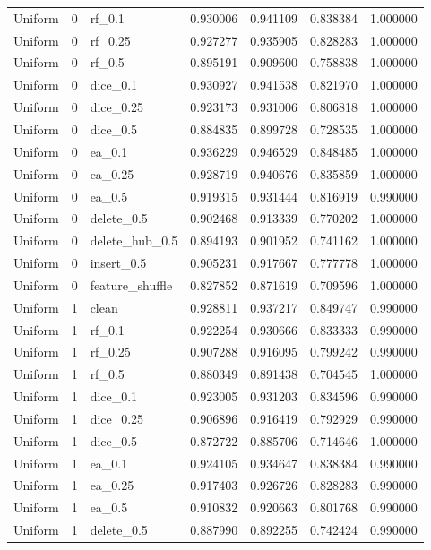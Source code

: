 \documentclass[UTF8,a4paper,11pt,fontset=fandol]{ctexart}
\begin{document}
{\begin{longtable}{lrlrrrr}
Uniform & 0 & rf\_0.1 & 0.930006 & 0.941109 & 0.838384 & 1.000000 \\
Uniform & 0 & rf\_0.25 & 0.927277 & 0.935905 & 0.828283 & 1.000000 \\
Uniform & 0 & rf\_0.5 & 0.895191 & 0.909600 & 0.758838 & 1.000000 \\
Uniform & 0 & dice\_0.1 & 0.930927 & 0.941538 & 0.821970 & 1.000000 \\
Uniform & 0 & dice\_0.25 & 0.923173 & 0.931006 & 0.806818 & 1.000000 \\
Uniform & 0 & dice\_0.5 & 0.884835 & 0.899728 & 0.728535 & 1.000000 \\
Uniform & 0 & ea\_0.1 & 0.936229 & 0.946529 & 0.848485 & 1.000000 \\
Uniform & 0 & ea\_0.25 & 0.928719 & 0.940676 & 0.835859 & 1.000000 \\
Uniform & 0 & ea\_0.5 & 0.919315 & 0.931444 & 0.816919 & 0.990000 \\
Uniform & 0 & delete\_0.5 & 0.902468 & 0.913339 & 0.770202 & 1.000000 \\
Uniform & 0 & delete\_hub\_0.5 & 0.894193 & 0.901952 & 0.741162 & 1.000000 \\
Uniform & 0 & insert\_0.5 & 0.905231 & 0.917667 & 0.777778 & 1.000000 \\
Uniform & 0 & feature\_shuffle & 0.827852 & 0.871619 & 0.709596 & 1.000000 \\
Uniform & 1 & clean & 0.928811 & 0.937217 & 0.849747 & 0.990000 \\
Uniform & 1 & rf\_0.1 & 0.922254 & 0.930666 & 0.833333 & 0.990000 \\
Uniform & 1 & rf\_0.25 & 0.907288 & 0.916095 & 0.799242 & 0.990000 \\
Uniform & 1 & rf\_0.5 & 0.880349 & 0.891438 & 0.704545 & 1.000000 \\
Uniform & 1 & dice\_0.1 & 0.923005 & 0.931203 & 0.834596 & 0.990000 \\
Uniform & 1 & dice\_0.25 & 0.906896 & 0.916419 & 0.792929 & 0.990000 \\
Uniform & 1 & dice\_0.5 & 0.872722 & 0.885706 & 0.714646 & 1.000000 \\
Uniform & 1 & ea\_0.1 & 0.924105 & 0.934647 & 0.838384 & 0.990000 \\
Uniform & 1 & ea\_0.25 & 0.917403 & 0.926726 & 0.828283 & 0.990000 \\
Uniform & 1 & ea\_0.5 & 0.910832 & 0.920663 & 0.801768 & 0.990000 \\
Uniform & 1 & delete\_0.5 & 0.887990 & 0.892255 & 0.742424 & 0.990000 \\

\end{longtable}}
\end{document}
